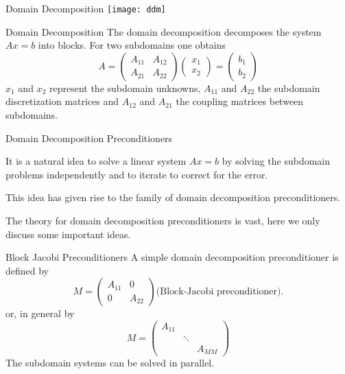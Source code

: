 \begin{frame}{Domain Decomposition}
  \texttt{[image: ddm]}
\end{frame}

\begin{frame}{Domain Decomposition}
  The domain decomposition decomposes the system $Ax = b$ into
  blocks. For two subdomains one obtains
  \begin{equation*}
A =
\begin{pmatrix}
  A_{11} & A_{12}\\
  A_{21} & A_{22}
\end{pmatrix}
\begin{pmatrix}
  x_1\\
  x_2
\end{pmatrix}
=
\begin{pmatrix}
  b_1\\
  b_2
\end{pmatrix}
\end{equation*}
$x_1$ and $x_2$ represent the subdomain unknowns, $A_{11}$ and $A_{22}$ the
subdomain discretization matrices and $A_{12}$ and $A_{21}$ the coupling
matrices between subdomains.
\end{frame}

\begin{frame}{Domain Decomposition Preconditioners}

It is a natural idea to solve a linear system $Ax = b$ by solving the
subdomain problems independently and to iterate to correct for
the error.

This idea has given rise to the family of domain decomposition
preconditioners.

The theory for domain decomposition preconditioners is vast,
here we only discuss some important ideas.

\end{frame}

\begin{frame}{Block Jacobi Preconditioners}
  A simple domain decomposition preconditioner is defined by
  \begin{equation*}
    M=
    \begin{pmatrix}
      A_{11}&0\\
      0 & A_{22}
    \end{pmatrix}\mbox{(Block-Jacobi preconditioner).}
  \end{equation*}
  or, in general by
  \begin{equation*}
    M=
    \begin{pmatrix}
      A_{11}&&\\
      &\ddots&\\
      &&A_{MM}
    \end{pmatrix}

  \end{equation*}
The subdomain systems can be solved in parallel.
\end{frame}

